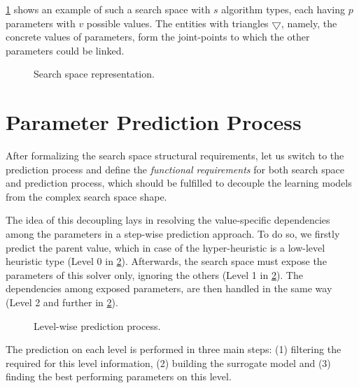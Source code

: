 \cref{concept:pict:Search Space Representation} shows an example of such a search space with $s$ algorithm types, each having $p$ parameters with $v$ possible values. The entities with triangles $\bigtriangledown$, namely, the concrete values of parameters, form the joint-points to which the other parameters could be linked. 

\begin{figure}[b]
	\centering
	
	\caption{Search space representation.}
	\label{concept:pict:Search Space Representation}
\end{figure}


\section{Parameter Prediction Process}\label{concept:prediction}
After formalizing the search space structural requirements, let us switch to the prediction process and define the  \emph{functional requirements} for both search space and prediction process, which should be fulfilled to decouple the learning models from the complex search space shape.

The idea of this decoupling lays in resolving the value-specific dependencies among the parameters in a step-wise prediction approach. To do so, we firstly predict the parent value, which in case of the hyper-heuristic is a low-level heuristic type (Level 0 in \cref{concept:pict:Level-wise prediction process}). Afterwards, the search space must expose the parameters of this solver only, ignoring the others (Level 1 in \cref{concept:pict:Level-wise prediction process}). The dependencies among exposed parameters, are then handled in the same way (Level 2 and further in \cref{concept:pict:Level-wise prediction process}).

\begin{figure}[hbt]
	\centering
	
	\caption{Level-wise prediction process.}
	\label{concept:pict:Level-wise prediction process}
\end{figure}

The prediction on each level is performed in three main steps: (1) filtering the required for this level information, (2) building the surrogate model and (3) finding the best performing parameters on this level.

